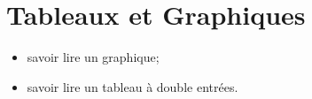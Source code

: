 \chapter{Tableaux et Graphiques}\label{ChTableauxGraphiques}


\vspace{5cm}

\begin{acquis}
\begin{itemize}
\item savoir lire un graphique;
\item savoir lire un tableau à double entrées.
\end{itemize}
\end{acquis}


\activites




\exercicesbase
\begin{colonne*exercice}

\end{colonne*exercice}


\exercicesappr
\begin{colonne*exercice}

\end{colonne*exercice}

\connaissances


\TravauxPratiques %


\pagebreak

\recreation



